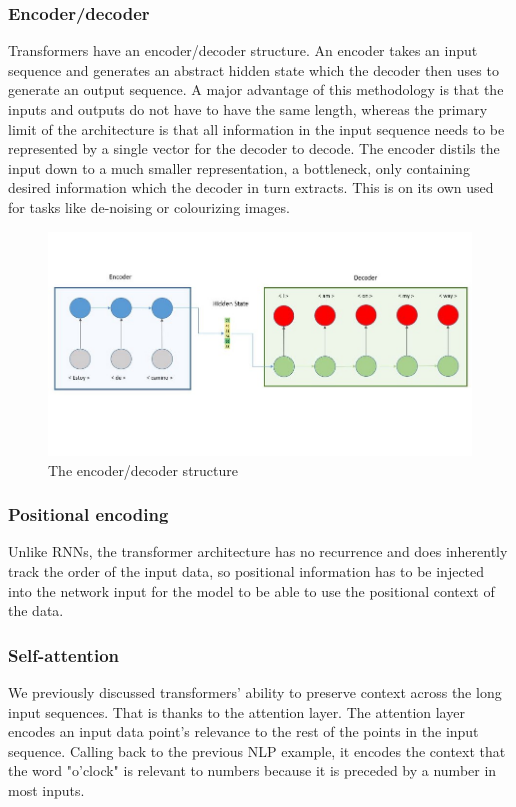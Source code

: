 \subsubsection{Encoder/decoder}
Transformers have an encoder/decoder structure. An encoder takes an input sequence and generates an abstract hidden state which the decoder then uses to generate an output sequence. A major advantage of this methodology is that the inputs and outputs do not have to have the same length, whereas the primary limit of the architecture is that all information in the input sequence needs to be represented by a single vector for the decoder to decode. The encoder distils the input down to a much smaller representation, a bottleneck, only containing desired information which the decoder in turn extracts. This is on its own used for tasks like de-noising or colourizing images. 

\begin{figure}[ht!]
    \centering
    \includegraphics[scale=0.5]{imgs/encoder_decoder.jpeg}
    \caption{The encoder/decoder structure
    \label{fig:encoder_decoder}}
\end{figure}

\subsubsection{Positional encoding}
Unlike RNNs, the transformer architecture has no recurrence and does inherently track the order of the input data, so positional information has to be injected into the network input for the model to be able to use the positional context of the data.\cite{vaswani_attention_2017}

\subsubsection{Self-attention} We previously discussed transformers' ability to preserve context across the long input sequences. That is thanks to the attention layer. The attention layer encodes an input data point's relevance to the rest of the points in the input sequence. Calling back to the previous NLP example, it encodes the context that the word "o'clock" is relevant to numbers because it is preceded by a number in most inputs.
 
